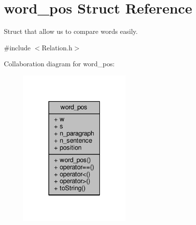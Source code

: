 \hypertarget{structword__pos}{}\section{word\+\_\+pos Struct Reference}
\label{structword__pos}


Struct that allow us to compare words easily.  




{\ttfamily \#include $<$Relation.\+h$>$}



Collaboration diagram for word\+\_\+pos\+:\nopagebreak
\begin{figure}[H]
\begin{center}
\leavevmode
\includegraphics[width=159pt]{structword__pos__coll__graph}
\end{center}
\end{figure}
